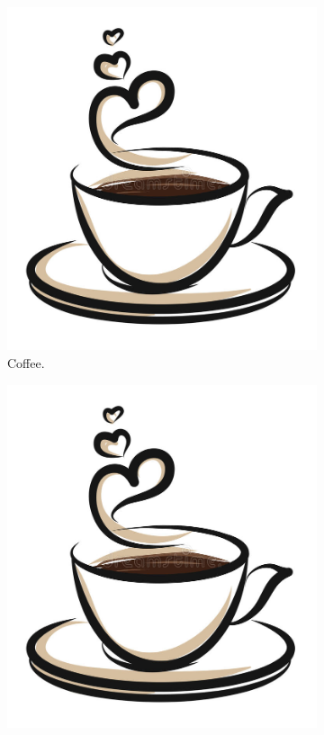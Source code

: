 \documentclass{article}
\begin{document}

\begin{figure}[h!]
  \centering
  \begin{subfigure}[b]{0.4\linewidth}
  \includegraphics[width=\linewidth]{coffee.jpg}
  \caption{Coffee.}
  \end{subfigure}
  \begin{subfigure}[b]{0.4\linewidth}
  \includegraphics[width=\linewidth]{coffee.jpg}

\end{subfigure}
\end{figure}
\end{document}
